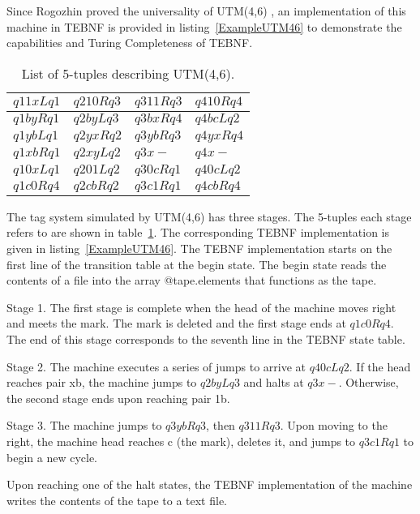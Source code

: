 \indent
Since Rogozhin proved the universality of UTM(4,6) \cite{rogozhin_01}, an implementation of this machine in TEBNF is provided in listing~\ref{ExampleUTM46} to demonstrate the capabilities and Turing Completeness of TEBNF.

\begin{table}[h]
\begin{center}
\caption{List of 5-tuples describing UTM(4,6).}
\label{FiveTuples}
\begin{tabular}{|l|l|l|l|} \hline
$q11xLq1$ & $q210Rq3$ & $q311Rq3$ & $q410Rq4$ \\ \hline
$q1byRq1$ & $q2byLq3$ & $q3bxRq4$ & $q4bcLq2$ \\ \hline
$q1ybLq1$ & $q2yxRq2$ & $q3ybRq3$ & $q4yxRq4$ \\ \hline
$q1xbRq1$ & $q2xyLq2$ & $q3x-$    & $q4x-   $ \\ \hline
$q10xLq1$ & $q201Lq2$ & $q30cRq1$ & $q40cLq2$ \\ \hline
$q1c0Rq4$ & $q2cbRq2$ & $q3c1Rq1$ & $q4cbRq4$ \\ \hline
\end{tabular}
\end{center}
\end{table}

The tag system simulated by UTM(4,6) \cite{rogozhin_01} has three stages.  The 5-tuples each stage refers to are shown in table~\ref{FiveTuples}.  The corresponding TEBNF implementation is given in listing~\ref{ExampleUTM46}. The TEBNF implementation starts on the first line of the transition table at the begin state.  The begin state reads the contents of a file into the array @tape.elements that functions as the tape.

\indent
Stage 1.  The first stage is complete when the head of the machine moves right and meets the mark.  The mark is deleted and the first stage ends at $q1c0Rq4$.  The end of this stage corresponds to the seventh line in the TEBNF state table.

\indent 
Stage 2.  The machine executes a series of jumps to arrive at $q40cLq2$.  If the head reaches pair xb, the machine jumps to $q2byLq3$ and halts at $q3x-$.  Otherwise, the second stage ends upon reaching pair 1b.

\indent
Stage 3.  The machine jumps to $q3ybRq3$, then $q311Rq3$.  Upon moving to the right, the machine head reaches c (the mark), deletes it, and jumps to $q3c1Rq1$  to begin a new cycle.

\indent
Upon reaching one of the halt states, the TEBNF implementation of the machine writes the contents of the tape to a text file. 

